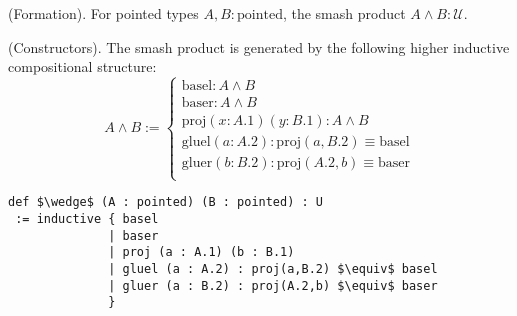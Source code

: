 \documentclass{article}
\begin{document}
\begin{definition} (Formation).
For pointed types \( A, B : \text{pointed} \), the smash product \( A \wedge B : \mathcal{U} \).
\end{definition}

\begin{definition} (Constructors).
The smash product is generated by the following higher inductive compositional structure:
\[
A \wedge B :=
\begin{cases}
\text{basel} : A \wedge B \\
\text{baser} : A \wedge B \\
\text{proj} (x: A.1) (y: B.1) : A \wedge B \\
\text{gluel} (a: A.2) : \text{proj}(a,B.2) \equiv \text{basel} \\
\text{gluer} (b: B.2) : \text{proj}(A.2,b) \equiv \text{baser} \\
\end{cases}
\]
\begin{lstlisting}[mathescape=true]
def $\wedge$ (A : pointed) (B : pointed) : U
 := inductive { basel
              | baser
              | proj (a : A.1) (b : B.1)
              | gluel (a : A.2) : proj(a,B.2) $\equiv$ basel
              | gluer (a : B.2) : proj(A.2,b) $\equiv$ baser
              }
\end{lstlisting}
\end{definition}
\end{document}
